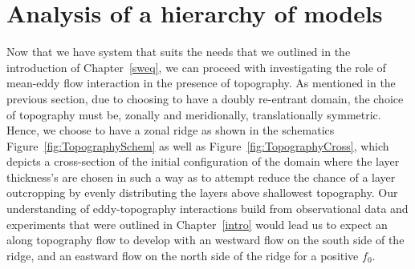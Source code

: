 \documentclass[12pt,a4paper]{report}
\newcommand*\figref[1]{Figure~\ref{#1}}
\begin{document}
\chapter{Analysis of a hierarchy of models}
\label{analysis}

Now that we have system that suits the needs that we outlined in the
introduction of Chapter~\ref{sweq}, we can proceed with investigating the
role of mean-eddy flow interaction in the presence of topography.
As mentioned in the previous section, due to choosing to have a doubly re-entrant
domain, the choice of topography must be, zonally and meridionally, 
translationally symmetric.
Hence, we choose to have a zonal ridge as shown in the schematics
 \figref{fig:TopographySchem} as well as \figref{fig:TopographyCross}, which
 depicts a cross-section of the initial configuration of the domain where
 the layer thickness's are chosen in such a way as to attempt reduce the chance of a
 layer outcropping by evenly distributing the layers above shallowest topography. Our
 understanding of eddy-topography interactions build from observational 
 data and experiments that were outlined in Chapter~\ref{intro} would lead us
 to expect an along topography flow to develop with an westward flow on the south side of
 the ridge, and an eastward flow on the north side of the ridge for a positive $f_{0}$.
\end{document}
